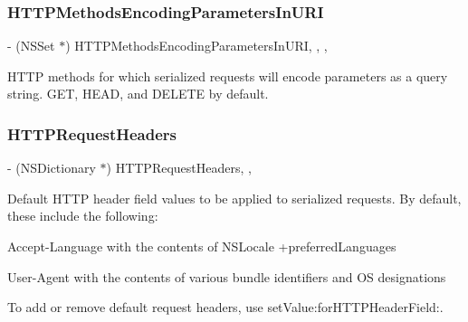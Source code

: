 \subsubsection{\texorpdfstring{H\+T\+T\+P\+Methods\+Encoding\+Parameters\+In\+U\+RI}{HTTPMethodsEncodingParametersInURI}}
{\footnotesize\ttfamily -\/ (N\+S\+Set $\ast$) H\+T\+T\+P\+Methods\+Encoding\+Parameters\+In\+U\+RI\hspace{0.3cm}{\ttfamily [read]}, {\ttfamily [write]}, {\ttfamily [nonatomic]}, {\ttfamily [strong]}}

H\+T\+TP methods for which serialized requests will encode parameters as a query string. {\ttfamily G\+ET}, {\ttfamily H\+E\+AD}, and {\ttfamily D\+E\+L\+E\+TE} by default. \mbox{\label{interface_a_f_h_t_t_p_request_serializer_a8ea98a933795e97a771f4b5a82a637c2}} 
\subsubsection{\texorpdfstring{H\+T\+T\+P\+Request\+Headers}{HTTPRequestHeaders}}
{\footnotesize\ttfamily -\/ (N\+S\+Dictionary $\ast$) H\+T\+T\+P\+Request\+Headers\hspace{0.3cm}{\ttfamily [read]}, {\ttfamily [nonatomic]}, {\ttfamily [strong]}}

Default H\+T\+TP header field values to be applied to serialized requests. By default, these include the following\+:


\begin{DoxyItemize}
\item {\ttfamily Accept-\/\+Language} with the contents of {\ttfamily N\+S\+Locale +preferred\+Languages}
\item {\ttfamily User-\/\+Agent} with the contents of various bundle identifiers and OS designations
\end{DoxyItemize}

To add or remove default request headers, use {\ttfamily set\+Value\+:for\+H\+T\+T\+P\+Header\+Field\+:}. \mbox{\label{interface_a_f_h_t_t_p_request_serializer_a87ed9e46c52d429016869a7d2bc46b97}} 
